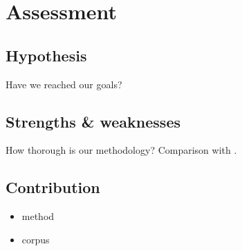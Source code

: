 \chapter{Assessment}
\label{chp:assessment}

\section{Hypothesis}
Have we reached our goals?
\section{Strengths \& weaknesses}
How thorough is our methodology? Comparison with
\cite{dik2008,dik2009,mambrini2012}.
\section{Contribution}
\begin{itemize}
\item method
\item corpus
\end{itemize}

